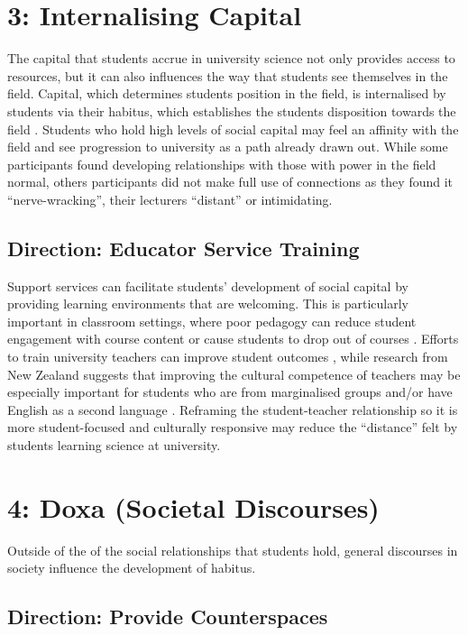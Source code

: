 \section{3: Internalising Capital}
The capital that students accrue in university science not only provides access to resources, but it can also influences the way that students see themselves in the field. Capital, which determines students position in the field, is internalised by students via their habitus, which establishes the students disposition towards the field \cite{Bourdieu1992}. Students who hold high levels of social capital may feel an affinity with the field and see progression to university as a path already drawn out. While some participants found developing relationships with those with power in the field normal, others participants did not make full use of connections as they found it ``nerve-wracking'', their lecturers ``distant'' or intimidating. 


\subsection{Direction: Educator Service Training}
Support services can facilitate students' development of social capital by providing learning environments that are welcoming. This is particularly important in classroom settings, where poor pedagogy can reduce student engagement with course content or cause students to  drop out of courses \cite{russell2011factors}. Efforts to train university teachers can improve student outcomes \cite{gibbs2004impact}, while research from New Zealand suggests that improving the cultural competence of teachers may be especially important for students who are from marginalised groups \cite{ikiua2019pasifika} and/or have English as a second language \cite{campbell2008asian}. Reframing the student-teacher relationship so it is more student-focused \cite{gibbs2004impact} and culturally responsive \cite{ikiua2019pasifika} may reduce the ``distance'' felt by students learning science at university.  




\section{4: Doxa (Societal Discourses)}
Outside of the of the social relationships that students hold, general discourses in society influence the development of habitus.

\subsection{Direction: Provide Counterspaces}


